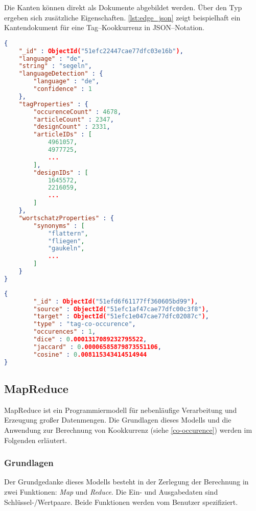 Die Kanten können direkt als Dokumente abgebildet werden. Über den Typ ergeben sich zusätzliche Eigenschaften. \cref{lst:edge_json} zeigt beispielhaft ein Kantendokument für eine Tag--Kookkurrenz in JSON--Notation.

\begin{lstlisting}[language=json, label={lst:node_json}, caption={Knotendokument in JSON}]
{
    "_id" : ObjectId("51efc22447cae77dfc03e16b"),
    "language" : "de",
    "string" : "segeln",
    "languageDetection" : {
        "language" : "de",
        "confidence" : 1
    },
    "tagProperties" : {
        "occurenceCount" : 4678,
        "articleCount" : 2347,
        "designCount" : 2331,
        "articleIDs" : [ 
            4961057, 
            4977725, 
            ...
        ],
        "designIDs" : [ 
            1645572, 
            2216059, 
            ...
        ]
    },
    "wortschatzProperties" : {
        "synonyms" : [ 
            "flattern", 
            "fliegen", 
            "gaukeln", 
            ...
        ]
    }
}
\end{lstlisting}

\begin{lstlisting}[language=json, label={lst:edge_json}, caption={Kantendokument in JSON}]
{
        "_id" : ObjectId("51efd6f61177ff360605bd99"),
        "source" : ObjectId("51efc1af47cae77dfc00c3f8"),
        "target" : ObjectId("51efc1e047cae77dfc02087c"),
        "type" : "tag-co-occurence",
        "occurences" : 1,
        "dice" : 0.0001317089232795522,
        "jaccard" : 0.00006585879873551106,
        "cosine" : 0.008115343414514944
}
\end{lstlisting}

\subsection{MapReduce}
\label{mapreduce}

MapReduce \cite{dg2004} ist ein Programmiermodell für nebenläufige Verarbeitung und Erzeugung großer Datenmengen. Die Grundlagen dieses Modells und die Anwendung zur Berechnung von Kookkurrenz (siehe \cref{co-occurence}) werden im Folgenden erläutert.

\subsubsection{Grundlagen}
\label{mapreduce_basic}

 Der Grundgedanke dieses Modells besteht in der Zerlegung der Berechnung in zwei Funktionen: \emph{Map} und \emph{Reduce}. Die Ein- und Ausgabedaten sind Schlüssel-/Wertpaare. Beide Funktionen werden vom Benutzer spezifiziert.

